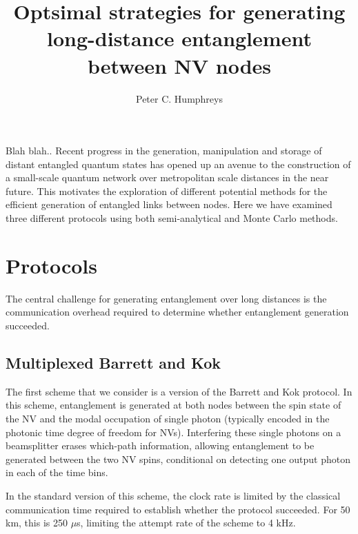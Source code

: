 \documentclass[aps,pra,superscriptaddress,preprint]{revtex4-1}
\begin{document}
\title{Optsimal strategies for generating long-distance entanglement between NV nodes}

\author{Peter C. Humphreys}


\begin{abstract}
\end{abstract}

Blah blah.. Recent progress in the generation, manipulation and storage of distant entangled quantum states has opened up an avenue to the construction of a small-scale quantum network over metropolitan scale distances in the near future. This motivates the exploration of different potential methods for the efficient generation of entangled links between nodes. Here we have examined three different protocols using both semi-analytical and Monte Carlo methods. 

\section{Protocols}

The central challenge for generating entanglement over long distances is the communication overhead required to determine whether entanglement generation succeeded. 

\subsection{Multiplexed Barrett and Kok}

The first scheme that we consider is a version of the Barrett and Kok protocol. In this scheme, entanglement is generated at both nodes between the spin state of the NV and the modal occupation of single photon (typically encoded in the photonic time degree of freedom for NVs). Interfering these single photons on a beamsplitter erases which-path information, allowing entanglement to be generated between the two NV spins, conditional on detecting one output photon in each of the time bins. 

In the standard version of this scheme, the clock rate is limited by the classical communication time required to establish whether the protocol succeeded. For 50 km, this is 250 $\mu$s, limiting the attempt rate of the scheme to 4 kHz.  
\end{document}
